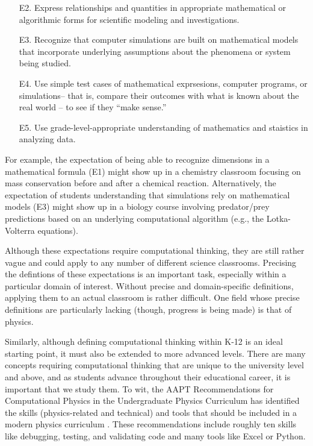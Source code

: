 \documentclass{msuphddissertation}
\begin{document}
\begin{doublespace}
\begin{enumerate}
\item[E2.] Express relationships and quantities in appropriate mathematical or algorithmic forms for scientific modeling and investigations.

\item[E3.] Recognize that computer simulations are built on mathematical models that incorporate underlying assumptions about the phenomena or system being studied.

\item[E4.] Use simple test cases of mathematical exprsesions, computer programs, or simulations-- that is, compare their outcomes with what is known about the real world -- to see if they ``make sense.''

\item[E5.] Use grade-level-appropriate understanding of mathematics and staistics in analyzing data.
\end{enumerate}

For example, the expectation of being able to recognize dimensions in a mathematical formula (E1) might show up in a chemistry classroom focusing on mass conservation before and after a chemical reaction.  Alternatively, the expectation of students understanding that simulations rely on mathematical models (E3) might show up in a biology course involving predator/prey predictions based on an underlying computational algorithm (e.g., the Lotka-Volterra equations). 

Although these expectations require computational thinking, they are still rather vague and could apply to any number of different science classrooms.  Precising the defintions of these expectations is an important task, especially within a particular domain of interest.  Without precise and domain-specific definitions, applying them to an actual classroom is rather difficult.  One field whose precise definitions are particularly lacking (though, progress is being made) is that of physics.

Similarly, although defining computational thinking within K-12 is an ideal starting point, it must also be extended to more advanced levels.  There are many concepts requiring computational thinking that are unique to the university level and above, and as students advance throughout their educational career, it is important that we study them.  To wit, the AAPT Recommendations for Computational Physics in the Undergraduate Physics Curriculum has identified the skills (physics-related and technical) and tools that should be included in a modern physics curriculum \cite{AAPT2016}.  These recommendations include roughly ten skills like debugging, testing, and validating code and many tools like Excel or Python.


\end{doublespace}
\end{document}
